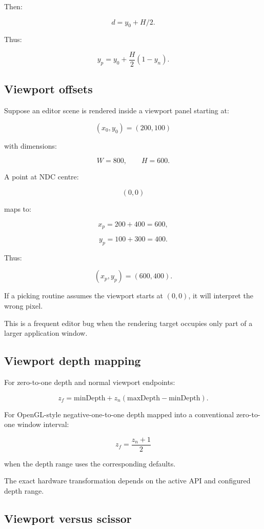 Then:

\[
 d=y_0+H/2.
\]

Thus:

\[
 \boxed{ y_p=y_0+\frac H2(1-y_n) }.
\]

\subsection{Viewport offsets}\label{02-foundations-ii-ch033-viewport-offsets}

Suppose an editor scene is rendered inside a viewport panel starting at:

\[
 (x_0,y_0)=(200,100)
\]

with dimensions:

\[
 W=800,\qquad H=600.
\]

A point at NDC centre:

\[
 (0,0)
\]

maps to:

\[
 x_p=200+400=600,
\]

\[
 y_p=100+300=400.
\]

Thus:

\[
 \boxed{(x_p,y_p)=(600,400)}.
\]

If a picking routine assumes the viewport starts at \((0,0)\), it will interpret the wrong pixel.

This is a frequent editor bug when the rendering target occupies only part of a larger application window.

\subsection{Viewport depth mapping}\label{02-foundations-ii-ch033-viewport-depth-mapping}

For zero-to-one depth and normal viewport endpoints:

\[
 \boxed{ z_f=\mathrm{minDepth} + z_n(\mathrm{maxDepth}-\mathrm{minDepth}) }.
\]

For OpenGL-style negative-one-to-one depth mapped into a conventional zero-to-one window interval:

\[
 \boxed{ z_f=\frac{z_n+1}{2} }
\]

when the depth range uses the corresponding defaults.

The exact hardware transformation depends on the active API and configured depth range.

\subsection{Viewport versus scissor}\label{02-foundations-ii-ch033-viewport-versus-scissor}

